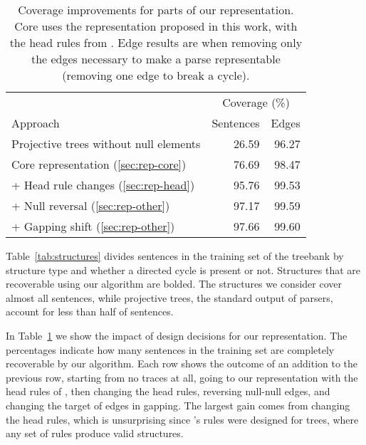 \begin{table}
\centering
  \vspace{2mm}
  \begin{tabular}{|lrr|}
    \hline
    & \multicolumn{2}{c}{Coverage (\%)} \\
    Approach & Sentences & Edges \\
    \hline
    \hline
    Projective trees without null elements & 26.59 & 96.27 \\
    \hline
    Core representation (\ref{sec:rep-core}) & 76.69 & 98.47 \\
    + Head rule changes (\ref{sec:rep-head}) & 95.76 & 99.53 \\
    + Null reversal (\ref{sec:rep-other}) & 97.17 & 99.59 \\
    + Gapping shift (\ref{sec:rep-other}) & 97.66 & 99.60 \\
    \hline
  \end{tabular}
  \caption[Coverage improvements for parts of our graph representation.]{ \label{tab:coverage}
    Coverage improvements for parts of our representation.
    Core uses the representation proposed in this work, with the head rules from \textcite{cck}.
    Edge results are when removing only the edges necessary to make a parse representable (\myeg removing one edge to break a cycle).
  }
\end{table}


Table~\ref{tab:structures} divides sentences in the training set of the treebank by structure type and whether a directed cycle is present or not.
Structures that are recoverable using our algorithm are bolded.
The structures we consider cover almost all sentences, while projective trees, the standard output of parsers, account for less than half of sentences.

In Table~\ref{tab:coverage} we show the impact of design decisions for our representation.
The percentages indicate how many sentences in the training set are completely recoverable by our algorithm.
Each row shows the outcome of an addition to the previous row, starting from no traces at all, going to our representation with the head rules of \textcite{cck}, then changing the head rules, reversing null-null edges, and changing the target of edges in gapping.
The largest gain comes from changing the head rules, which is unsurprising since \textcite{cck}'s rules were designed for trees, where any set of rules produce valid structures.


